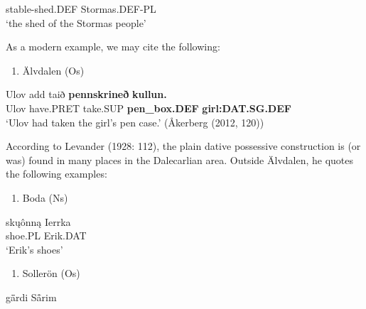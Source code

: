 stable-shed.DEF  Stormas.DEF-PL\\ %


‘the shed of the Stormas people’
\z


As a modern example, we may cite the following:

\begin{enumerate} %
\item 
Älvdalen (Os)

\end{enumerate} %
\ea\label{}
\gll Ulov  add  taið  \textbf{pennskrineð} \textbf{kullun.}\\


Ulov  have.PRET  take.SUP  \textbf{pen\_box.DEF} \textbf{girl:DAT.SG.DEF}\\ %


‘Ulov had taken the girl’s pen case.’ (Åkerberg (2012, 120))
\z

According to Levander (1928: 112), the plain dative possessive construction is (or was) found in many places in the Dalecarlian area. Outside Älvdalen, he quotes the following examples:

\begin{enumerate} %
\item 
Boda (Ns)

\end{enumerate} %
\ea\label{}
\gll sk\k{u}ônną  Ierrka\\


shoe.PL  Erik.DAT\\ %


‘Erik’s shoes’
\z


\begin{enumerate} %
\item 
Sollerön (Os)

\end{enumerate} %
\ea\label{}
\gll g\={ä}rdi  S\={å}rim\\


